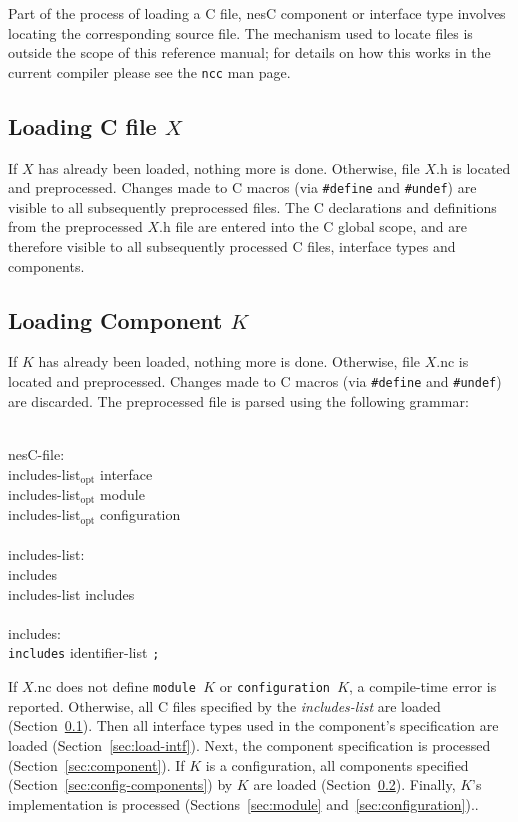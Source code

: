 \documentclass[11pt]{article}
\newcommand{\kw}[1]{{\tt #1}}
\newcommand{\code}[1]{{\tt #1}}
\newcommand{\file}[1]{{\tt #1}}
\newcommand{\nesc}{nesC\xspace}
\newcommand{\opt}{$_{\mbox{opt}}$\xspace}
\begin{document}
Part of the process of loading a C file, \nesc component or interface type
involves locating the corresponding source file. The mechanism used to
locate files is outside the scope of this reference manual; for details on
how this works in the current compiler please see the \file{ncc} man page.

\subsection{Loading C file $X$}
\label{sec:load-c}

If $X$ has already been loaded, nothing more is done. Otherwise, file $X$.h
is located and preprocessed. Changes made to C macros (via \code{\#define}
and \code{\#undef}) are visible to all subsequently preprocessed files. The C
declarations and definitions from the preprocessed $X$.h file are entered
into the C global scope, and are therefore visible to all subsequently
processed C files, interface types and components.

\subsection{Loading Component $K$}
\label{sec:load-component}

If $K$ has already been loaded, nothing more is done. Otherwise, file
$X$.nc is located and preprocessed. Changes made to C macros (via
\code{\#define} and \code{\#undef}) are discarded. The preprocessed file is
parsed using the following grammar: \em \begin{tabbing}
\hspace*{2cm}\= \\ \kill
nesC-file: \\
\>	includes-list\opt interface\\
\>	includes-list\opt module\\
\>	includes-list\opt configuration\\
\\
includes-list:\\
\>	includes\\
\>	includes-list includes\\
\\
includes:\\
\>	\kw{includes} identifier-list \kw{;}\\
\end{tabbing} \rm
If $X$.nc does not define \code{module $K$} or \code{configuration $K$}, a
compile-time error is reported. Otherwise, all C files specified by the
\emph{includes-list} are loaded (Section~\ref{sec:load-c}). Then all
interface types used in the component's specification are loaded
(Section~\ref{sec:load-intf}). Next, the component specification is
processed (Section~\ref{sec:component}). If $K$ is a configuration, all
components specified (Section~\ref{sec:config-components}) by $K$ are
loaded (Section~\ref{sec:load-component}). Finally, $K$'s implementation is
processed (Sections~\ref{sec:module} and~\ref{sec:configuration})..
\end{document}
